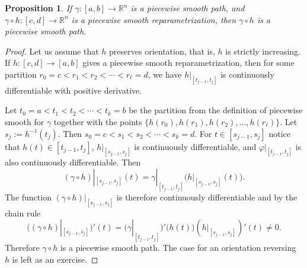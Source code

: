 \documentclass[12pt]{book}
\newcommand{\R}{{\mathbb{R}}}
\theoremstyle{plain}
\newtheorem{prop}[thm]{Proposition}
\theoremstyle{remark}
\theoremstyle{definition}
\theoremstyle{exercise}
\theoremstyle{example}
\begin{document}

\begin{prop} \label{prop:reparamapiecewisesmooth}
If $\gamma \colon [a,b] \to \R^n$ is a piecewise smooth path,
and $\gamma \circ h \colon [c,d] \to \R^n$ is
a piecewise smooth reparametrization, then $\gamma \circ h$
is a piecewise smooth path.
\end{prop}

\begin{proof}
Let us assume that $h$ preserves orientation, that is, $h$ is strictly
increasing.
If $h \colon [c,d] \to [a,b]$ gives a piecewise smooth reparametrization,
then for some partition
$r_0 = c < r_1 < r_2 < \cdots < r_\ell = d$, we have
$h|_{[t_{j-1},t_j]}$ is continuously differentiable with positive
derivative.


Let $t_0 = a < t_1 < t_2 < \cdots < t_k = b$ be the partition from the
definition of piecewise smooth for $\gamma$ together with the 
points $\{ h(r_0), h(r_1), h(r_2), \ldots, h(r_\ell) \}$.
Let $s_j := h^{-1}(t_j)$.  Then
$s_0 = c < s_1 < s_2 < \cdots < s_k = d$.
For $t \in [s_{j-1},s_j]$ notice that $h(t) \in [t_{j-1},t_j]$,
$h|_{[s_{j-1},s_j]}$ is continuously differentiable, and
$\varphi|_{[t_{j-1},t_j]}$ is also continuously differentiable.
Then
\begin{equation*}
(\gamma \circ h)|_{[s_{j-1},s_{j}]} (t)
=
\gamma|_{[t_{j-1},t_{j}]} \bigl( h|_{[s_{j-1},s_j]}(t) \bigr) .
\end{equation*}
The function 
$(\gamma \circ h)|_{[s_{j-1},s_{j}]}$ is therefore continuously
differentiable and
by the chain rule
\begin{equation*}
\bigl( (\gamma \circ h)|_{[s_{j-1},s_{j}]} \bigr) ' (t)
=
\bigl( \gamma|_{[t_{j-1},t_{j}]} \bigr)' \bigl( h(t) \bigr)
(h|_{[s_{j-1},s_j]})'(t) \not= 0 .
\end{equation*}
Therefore $\gamma \circ h$ is a piecewise smooth path.  The case for an
orientation reversing $h$ is left as an exercise.
\end{proof}
\end{document}
